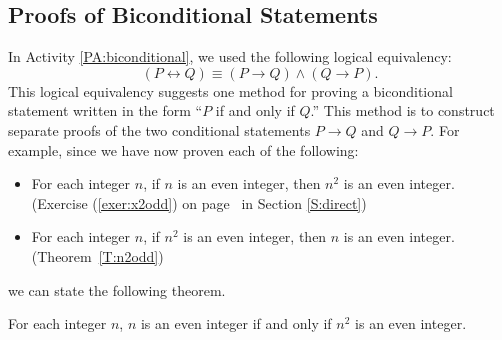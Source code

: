 \subsection*{Proofs of Biconditional Statements}
%
%

In \typeu Activity \ref*{PA:biconditional}, we used the following logical equivalency:
\[
\left( {P \leftrightarrow Q} \right) \equiv \left( {P \to Q} \right) \wedge \left( {Q \to P} \right).
\]
This logical equivalency suggests one method for proving a biconditional statement written in the form  ``$P$  if and only if  $Q$.''  This method is to construct separate proofs of the two conditional statements  $P \to Q$  and  $Q \to P$.  For example, since we have now proven each of the following:

\begin{itemize}
  \item For each integer $n$, if  $n$  is an even integer, then  $n^2 $ is an even integer. (Exercise (\ref{exer:x2odd}) on page~\pageref{exer:x2odd} in Section \ref{S:direct})
  \item For each integer $n$, if  $n^2 $ is an even integer, then  $n$  is an even integer. (Theorem~\ref{T:n2odd})
\end{itemize}

\noindent
we can state the following theorem.
\begin{theorem}\label{T:n2isodd} 
For each integer $n$,   $n$  is an even integer if and only if  $n^2 $ is an even integer.
\end{theorem}

\hbreak
%

